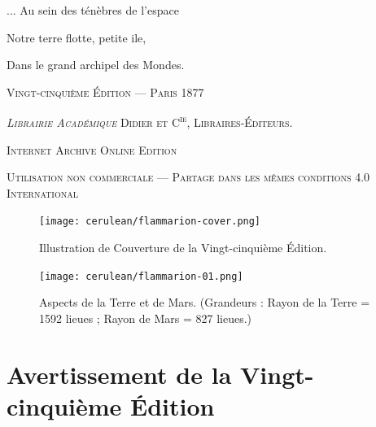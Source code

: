 \documentclass[a4paper, 11pt, oneside, landscape]{article}
\begin{document}
\begin{titlepage}
        {\begin{flushright}
        \small
        ... Au sein des ténèbres de l'espace
        
        Notre terre flotte, petite ile,
        
        Dans le grand archipel des Mondes.
        \end{flushright}}

        \vspace*{\fill}

	\vspace{0.1\baselineskip}

	{\small\scshape Vingt-cinquième Édition --- Paris 1877}
	
	{\small\scshape{\emph{Librairie Académique} Didier et C\textsuperscript{ie}, Libraires-Éditeurs.}}
	
	\vspace{0.3\baselineskip} %

        \scshape Internet Archive Online Edition  %
	
	{\scshape\small Utilisation non commerciale --- Partage dans les mêmes conditions 4.0 International} %
\end{titlepage}
\pagestyle{fancy}
\fancyhf{}
\cfoot{\bfseries{\thepage}}
\Large
\setlength{\parskip}{1mm plus1mm minus1mm}
\clearpage
\begin{landscape}
\vspace*{\fill}
\begin{figure}[H]
\centering
\texttt{[image: cerulean/flammarion-cover.png]}
\caption*{Illustration de Couverture de la Vingt-cinquième Édition.}
\end{figure}
\vspace*{\fill}
\end{landscape}
\clearpage
\tableofcontents
\clearpage
\begin{landscape}
\vspace*{\fill}
\begin{figure}[H]
\centering
\texttt{[image: cerulean/flammarion-01.png]}
\caption{Aspects de la Terre et de Mars. (Grandeurs : Rayon de la Terre = 1592 lieues ; Rayon de Mars = 827 lieues.)}
\end{figure}
\vspace*{\fill}
\end{landscape}
\clearpage
\section*{Avertissement de la Vingt-cinquième Édition}
\end{document}
